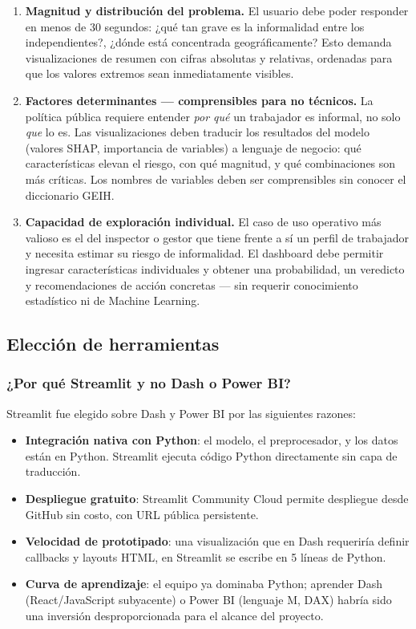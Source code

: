 \documentclass[12pt, a4paper]{article}
\begin{document}
\begin{enumerate}[label=\arabic*.]
  \item \textbf{Magnitud y distribución del problema.}
  El usuario debe poder responder en menos de 30 segundos: ¿qué tan grave es la
  informalidad entre los independientes?, ¿dónde está concentrada geográficamente?
  Esto demanda visualizaciones de resumen con cifras absolutas y relativas,
  ordenadas para que los valores extremos sean inmediatamente visibles.

  \item \textbf{Factores determinantes — comprensibles para no técnicos.}
  La política pública requiere entender \textit{por qué} un trabajador es informal,
  no solo \textit{que} lo es. Las visualizaciones deben traducir los resultados del
  modelo (valores SHAP, importancia de variables) a lenguaje de negocio: qué
  características elevan el riesgo, con qué magnitud, y qué combinaciones son
  más críticas. Los nombres de variables deben ser comprensibles sin conocer el
  diccionario GEIH.

  \item \textbf{Capacidad de exploración individual.}
  El caso de uso operativo más valioso es el del inspector o gestor que tiene
  frente a sí un perfil de trabajador y necesita estimar su riesgo de informalidad.
  El dashboard debe permitir ingresar características individuales y obtener una
  probabilidad, un veredicto y recomendaciones de acción concretas —
  sin requerir conocimiento estadístico ni de Machine Learning.
\end{enumerate}

\subsection{Elección de herramientas}

\subsubsection{¿Por qué Streamlit y no Dash o Power BI?}

Streamlit fue elegido sobre Dash y Power BI por las siguientes razones:

\begin{itemize}[noitemsep]
  \item \textbf{Integración nativa con Python}: el modelo, el preprocesador, y los datos
  están en Python. Streamlit ejecuta código Python directamente sin capa de traducción.
  \item \textbf{Despliegue gratuito}: Streamlit Community Cloud permite despliegue
  desde GitHub sin costo, con URL pública persistente.
  \item \textbf{Velocidad de prototipado}: una visualización que en Dash requeriría
  definir callbacks y layouts HTML, en Streamlit se escribe en 5 líneas de Python.
  \item \textbf{Curva de aprendizaje}: el equipo ya dominaba Python; aprender Dash
  (React/JavaScript subyacente) o Power BI (lenguaje M, DAX) habría sido una inversión
  desproporcionada para el alcance del proyecto.
\end{itemize}
\end{document}
